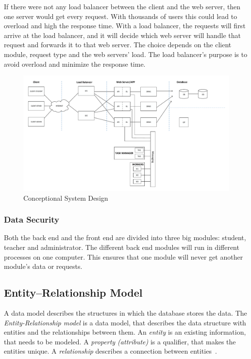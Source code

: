 If there were not any load balancer between the client and the web server, then one server would get every request. With thousands of users this could lead to overload and high the response time. With a load balancer, the requests will first arrive at the load balancer, and it will decide which web server will handle that request and forwards it to that web server. The choice depends on the client module, request type and the web servers' load. The load balancer's purpose is to avoid overload and minimize the response time.
 
 \begin{figure}[!htbp]
 	\includegraphics[width=0.95\textheight, angle=90]{figures/atfogo_rendszerterv_teljes.pdf}
 	\caption[Conceptional System Design]{Conceptional System Design}
 	\label{fig:conceptional-system-design}
 \end{figure}
 
 \subsubsection{Data Security}
 
 Both the back end and the front end are divided into three big modules: student, teacher and administrator. The different back end modules will run in different processes on one computer. This ensures that one module will never get another module's data or requests. 
 

 \newpage
\subsection{Entity–Relationship Model}
\label{ER-model}

A data model describes the structures in which the database stores the data. The \emph{Entity-Relationship model} is a data model, that describes the data structure with entities and the relationships between them. An \emph{entity} is an existing information, that needs to be modeled. A \emph{property (attribute)} is a qualifier, that makes the entities unique. A \emph{relationship} describes a connection between entities~\cite{adatb}.
 
